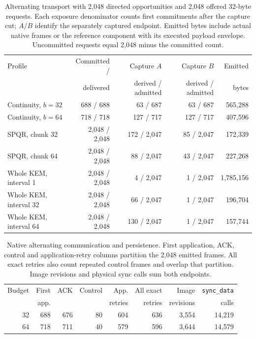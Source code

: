 \documentclass[pdflatex]{sn-jnl}
\theoremstyle{thmstyleone}
\theoremstyle{thmstylethree}
\theoremstyle{thmstyletwo}
\begin{document}
\begin{table}[t]
\centering
\small
\setlength{\tabcolsep}{3.5pt}
\begin{tabular}{@{}lrrrr@{}}
\toprule
Profile & Committed / & Capture $A$ & Capture $B$ & Emitted\\
 & delivered & derived / admitted & derived / admitted & bytes\\
\midrule
Continuity, $b=32$ & 688 / 688 & 63 / 687 & 63 / 687 & 565,288\\
Continuity, $b=64$ & 718 / 718 & 127 / 717 & 127 / 717 & 407,596\\
SPQR, chunk 32 & 2,048 / 2,048 & 172 / 2,047 & 85 / 2,047 & 172,339\\
SPQR, chunk 64 & 2,048 / 2,048 & 88 / 2,047 & 43 / 2,047 & 227,268\\
Whole KEM, interval 1 & 2,048 / 2,048 & 4 / 2,047 & 1 / 2,047 & 1,785,156\\
Whole KEM, interval 32 & 2,048 / 2,048 & 66 / 2,047 & 1 / 2,047 & 196,704\\
Whole KEM, interval 64 & 2,048 / 2,048 & 130 / 2,047 & 1 / 2,047 & 157,744\\
\bottomrule
\end{tabular}
\caption{Alternating transport with 2,048 directed opportunities and 2,048 offered 32-byte requests. Each exposure denominator counts first commitments after the capture cut; $A/B$ identify the separately captured endpoint. Emitted bytes include actual native frames or the reference component with its executed payload envelope. Uncommitted requests equal 2,048 minus the committed count.}
\label{tab:matched-opportunities}
\end{table}

\begin{table}[t]
\centering
\small
\setlength{\tabcolsep}{4pt}
\begin{tabular}{@{}rrrrrrrr@{}}
\toprule
Budget & First & ACK & Control & App. & All exact & Image & \texttt{sync\_data}\\
 & app. & & & retries & retries & revisions & calls\\
\midrule
32 & 688 & 676 & 80 & 604 & 636 & 3,554 & 14,219\\
64 & 718 & 711 & 40 & 579 & 596 & 3,644 & 14,579\\
\bottomrule
\end{tabular}
\caption{Native alternating communication and persistence. First application, ACK, control and application-retry columns partition the 2,048 emitted frames. All exact retries also count repeated control frames and overlap that partition. Image revisions and physical sync calls sum both endpoints.}
\label{tab:matched-accounting}
\end{table}
\end{document}
